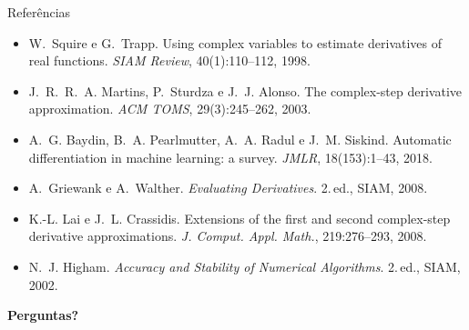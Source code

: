 \documentclass[aspectratio=169,11pt]{beamer}
\begin{document}
\begin{frame}{Referências}
  \small
  \begin{itemize}
    \item W.~Squire e G.~Trapp. Using complex variables to estimate derivatives of real functions. \emph{SIAM Review}, 40(1):110--112, 1998.
    \item J.~R.~R.~A. Martins, P.~Sturdza e J.~J. Alonso. The complex-step derivative approximation. \emph{ACM TOMS}, 29(3):245--262, 2003.
    \item A.~G. Baydin, B.~A. Pearlmutter, A.~A. Radul e J.~M. Siskind. Automatic differentiation in machine learning: a survey. \emph{JMLR}, 18(153):1--43, 2018.
    \item A.~Griewank e A.~Walther. \emph{Evaluating Derivatives}. 2.\,ed., SIAM, 2008.
    \item K.-L. Lai e J.~L. Crassidis. Extensions of the first and second complex-step derivative approximations. \emph{J. Comput. Appl. Math.}, 219:276--293, 2008.
    \item N.~J. Higham. \emph{Accuracy and Stability of Numerical Algorithms}. 2.\,ed., SIAM, 2002.
  \end{itemize}
  \vfill
  \centering\Large\color{azul}\textbf{Perguntas?}
\end{frame}
\end{document}
